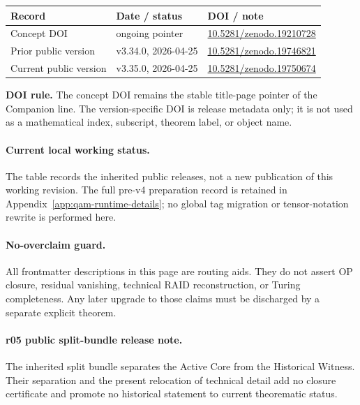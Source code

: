 \begin{center}
\small
\begin{tabular}{>{\raggedright\arraybackslash}p{} >{\raggedright\arraybackslash}p{} >{\raggedright\arraybackslash}p{}}
\toprule
\textbf{Record} & \textbf{Date / status} & \textbf{DOI / note}\\
\midrule
Concept DOI & ongoing pointer & \href{https://doi.org/10.5281/zenodo.19210728}{10.5281/zenodo.19210728}\\
Prior public version & v3.34.0, 2026-04-25 & \href{https://doi.org/10.5281/zenodo.19746821}{10.5281/zenodo.19746821}\\
Current public version & v3.35.0, 2026-04-25 & \href{https://doi.org/10.5281/zenodo.19750674}{10.5281/zenodo.19750674}\\
\bottomrule
\end{tabular}
\end{center}

\noindent\textbf{DOI rule.} The concept DOI remains the stable title-page pointer of the Companion line. The version-specific DOI is release metadata only; it is not used as a mathematical index, subscript, theorem label, or object name.

\paragraph{Current local working status.}
The table records the inherited public releases, not a new publication of this working revision. The full pre-v4 preparation record is retained in Appendix~\ref{app:qam-runtime-details}; no global tag migration or tensor-notation rewrite is performed here.

\paragraph{No-overclaim guard.}
All frontmatter descriptions in this page are routing aids. They do not assert OP closure, residual vanishing, technical RAID reconstruction, or Turing completeness. Any later upgrade to those claims must be discharged by a separate explicit theorem.


\paragraph{r05 public split-bundle release note.}
The inherited split bundle separates the Active Core from the Historical Witness. Their separation and the present relocation of technical detail add no closure certificate and promote no historical statement to current theorematic status.

